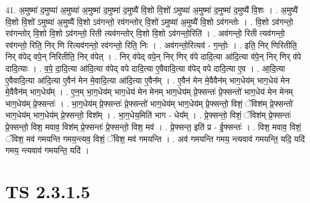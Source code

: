 \documentclass[17pt]{extarticle}
\begin{document}
41. अ॒मुष्मा॑ द॒मुष्या॑ अ॒मुष्या॑ अ॒मुष्मा॑ द॒मुष्मा॑ द॒मुष्यै॑ वि॒शो वि॒शो॑ ऽमुष्या॑ अ॒मुष्मा॑ द॒मुष्मा॑ द॒मुष्यै॑ वि॒शः । . अ॒मुष्यै॑ वि॒शो वि॒शो॑ ऽमुष्या॑ अ॒मुष्यै॑ वि॒शो ऽव॑गन्तो॒ रव॑गन्तोर् वि॒शो॑ ऽमुष्या॑ अ॒मुष्यै॑ वि॒शो ऽव॑गन्तोः । . वि॒शो ऽव॑गन्तो॒ रव॑गन्तोर् वि॒शो वि॒शो ऽव॑गन्तो॒ रिती त्यव॑गन्तोर् वि॒शो वि॒शो ऽव॑गन्तो॒रिति॑ । . अव॑गन्तो॒ रिती त्यव॑गन्तो॒ रव॑गन्तो॒ रिति॒ निर् णि रित्यव॑गन्तो॒ रव॑गन्तो॒ रिति॒ निः । . अव॑गन्तो॒रित्यव॑ - ग॒न्तोः॒ । . इति॒ निर् णिरितीति॒ निर् व॑पेद् वपे॒न् निरितीति॒ निर् व॑पेत् । . निर् व॑पेद् वपे॒न् निर् णिर् व॑पे दादि॒त्या आ॑दि॒त्या व॑पे॒न् निर् णिर् व॑पे दादि॒त्याः । . व॒पे॒ दा॒दि॒त्या आ॑दि॒त्या व॑पेद् वपे दादि॒त्या ए॒वैवादि॒त्या व॑पेद् वपे दादि॒त्या ए॒व । . आ॒दि॒त्या ए॒वैवादि॒त्या आ॑दि॒त्या ए॒वैन॑ मेन मे॒वादि॒त्या आ॑दि॒त्या ए॒वैन᳚म् । . ए॒वैन॑ मेन मे॒वैवैन॑म् भाग॒धेय॑म् भाग॒धेय॑ मेन मे॒वैवैन॑म् भाग॒धेय᳚म् । . ए॒न॒म् भा॒ग॒धेय॑म् भाग॒धेय॑ मेन मेनम् भाग॒धेय॑म् प्रे॒फ्सन्तः॑ प्रे॒फ्सन्तो॑ भाग॒धेय॑ मेन मेनम् भाग॒धेय॑म् प्रे॒फ्सन्तः॑ । . भा॒ग॒धेय॑म् प्रे॒फ्सन्तः॑ प्रे॒फ्सन्तो॑ भाग॒धेय॑म् भाग॒धेय॑म् प्रे॒फ्सन्तो॒ विशं॒ ॅविश॑म् प्रे॒फ्सन्तो॑ भाग॒धेय॑म् भाग॒धेय॑म् प्रे॒फ्सन्तो॒ विश᳚म् । . भा॒ग॒धेय॒मिति॑ भाग - धेय᳚म् । . प्रे॒फ्सन्तो॒ विशं॒ ॅविश॑म् प्रे॒फ्सन्तः॑ प्रे॒फ्सन्तो॒ विश॒ मवाव॒ विश॑म् प्रे॒फ्सन्तः॑ प्रे॒फ्सन्तो॒ विश॒ मव॑ । . प्रे॒फ्सन्त॒ इति॑ प्र - ई॒फ्सन्तः॑ । . विश॒ मवाव॒ विशं॒ ॅविश॒ मव॑ गमयन्ति गमय॒न्त्यव॒ विशं॒ ॅविश॒ मव॑ गमयन्ति । . अव॑ गमयन्ति गमय॒ न्त्यवाव॑ गमयन्ति॒ यदि॒ यदि॑ गमय॒ न्त्यवाव॑ गमयन्ति॒ यदि॑ । \newline
\pagebreak
{}
\section*{ TS 2.3.1.5 }
\end{document}
